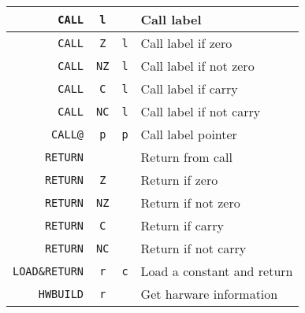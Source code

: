 \begin{table}[H]
\begin{tabular}{| r | c | c | l |}
\verb|CALL|&\verb|l|&\verb||& Call label \\ \hline
\verb|CALL|&\verb|Z|&\verb|l|& Call label if zero \\ \hline
\verb|CALL|&\verb|NZ|&\verb|l|& Call label if not zero \\ \hline
\verb|CALL|&\verb|C|&\verb|l|& Call label if carry \\ \hline
\verb|CALL|&\verb|NC|&\verb|l|& Call label if not carry \\ \hline
\verb|CALL@|&\verb|p|&\verb|p|& Call label pointer \\ \hline

\verb|RETURN|&\verb||&\verb||& Return from call \\ \hline
\verb|RETURN|&\verb|Z|&\verb||& Return if zero \\ \hline
\verb|RETURN|&\verb|NZ|&\verb||& Return if not zero  \\ \hline
\verb|RETURN|&\verb|C|&\verb||& Return if carry \\ \hline
\verb|RETURN|&\verb|NC|&\verb||& Return if not carry \\ \hline

\verb|LOAD&RETURN|&\verb|r|&\verb|c|& Load a constant and return \\ \hline

\verb|HWBUILD|&\verb|r|&\verb||& Get harware information\\ \hline
\end{tabular}
\end{table}


